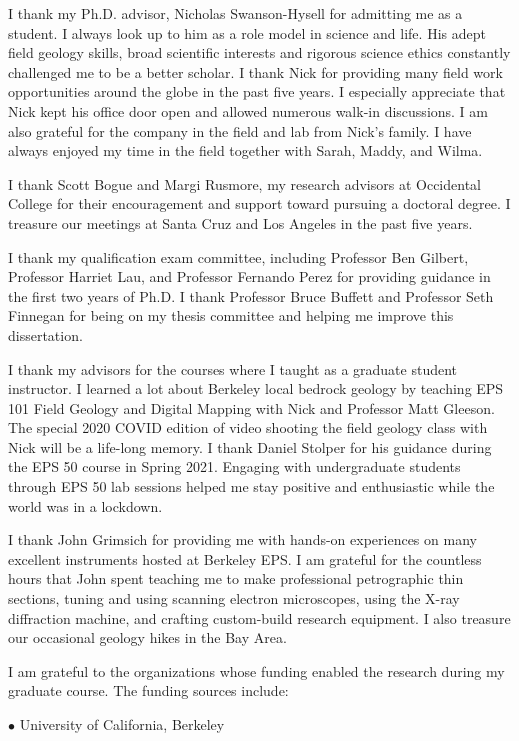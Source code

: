 \documentclass{ucbthesis}
\begin{document}
\begin{frontmatter}
\begin{acknowledgements}
I thank my Ph.D. advisor, Nicholas Swanson-Hysell for admitting me as a student. I always look up to him as a role model in science and life. His adept field geology skills, broad scientific interests and rigorous science ethics constantly challenged me to be a better scholar. I thank Nick for providing many field work opportunities around the globe in the past five years. I especially appreciate that Nick kept his office door open and allowed numerous walk-in discussions. I am also grateful for the company in the field and lab from Nick's family. I have always enjoyed my time in the field together with Sarah, Maddy, and Wilma. 

I thank Scott Bogue and Margi Rusmore, my research advisors at Occidental College for their encouragement and support toward pursuing a doctoral degree. I treasure our meetings at Santa Cruz and Los Angeles in the past five years. 

I thank my qualification exam committee, including Professor Ben Gilbert, Professor Harriet Lau, and Professor Fernando Perez for providing guidance in the first two years of Ph.D. I thank Professor Bruce Buffett and Professor Seth Finnegan for being on my thesis committee and helping me improve this dissertation. 

I thank my advisors for the courses where I taught as a graduate student instructor. I learned a lot about Berkeley local bedrock geology by teaching EPS 101 Field Geology and Digital Mapping with Nick and Professor Matt Gleeson. The special 2020 COVID edition of video shooting the field geology class with Nick will be a life-long memory. I thank Daniel Stolper for his guidance during the EPS 50 course in Spring 2021. Engaging with undergraduate students through EPS 50 lab sessions helped me stay positive and enthusiastic while the world was in a lockdown. 

I thank John Grimsich for providing me with hands-on experiences on many excellent instruments hosted at Berkeley EPS. I am grateful for the countless hours that John spent teaching me to make professional petrographic thin sections, tuning and using scanning electron microscopes, using the X-ray diffraction machine, and crafting custom-build research equipment. I also treasure our occasional geology hikes in the Bay Area.  

I am grateful to the organizations whose funding enabled the research during my graduate course. The funding sources include:

\vspace{5mm}
$\bullet$ University of California, Berkeley
    \vspace{5mm}


\end{acknowledgements}
\end{frontmatter}
\end{document}
